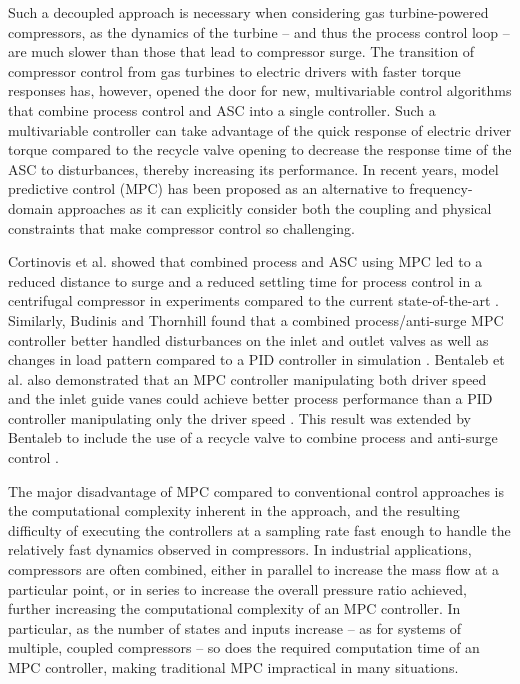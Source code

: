 Such a decoupled approach is necessary when considering gas turbine-powered compressors, as the dynamics of the turbine -- and thus the process control loop -- are much slower than those that lead to compressor surge. 
The transition of compressor control from gas turbines to electric drivers with faster torque responses has, however, opened the door for new, multivariable control algorithms that combine process control and ASC into a single controller.
Such a multivariable controller can take advantage of the quick response of electric driver torque compared to the recycle valve opening to decrease the response time of the ASC to disturbances, thereby increasing its performance.
In recent years, model predictive control (MPC) has been proposed as an alternative to frequency-domain approaches as it can explicitly consider both the coupling and physical constraints that make compressor control so challenging.

Cortinovis et al. showed that combined process and ASC using MPC led to a reduced distance to surge and a reduced settling time for process control in a centrifugal compressor in experiments compared to the current state-of-the-art \cite{Cortinovis2015}. 
Similarly, Budinis and Thornhill found that a combined process/anti-surge MPC controller better handled disturbances on the inlet and outlet valves as well as changes in load pattern compared to a PID controller in simulation \cite{Budinis2015}.
Bentaleb et al. also demonstrated that an MPC controller manipulating both driver speed and the inlet guide vanes could achieve better process performance than a PID controller manipulating only the driver speed \cite{Bentaleb2014}.
This result was extended by Bentaleb to include the use of a recycle valve to combine process and anti-surge control \cite{Bentaleb2015}.


The major disadvantage of MPC compared to conventional control approaches is the computational complexity inherent in the approach, and the resulting difficulty of executing the controllers at a sampling rate fast enough to handle the relatively fast dynamics observed in compressors. 
In industrial applications, compressors are often combined, either in parallel to increase the mass flow at a particular point, or in series to increase the overall pressure ratio achieved, further increasing the computational complexity of an MPC controller.
In particular, as the number of states and inputs increase -- as for systems of multiple, coupled compressors -- so does the required computation time of an MPC controller, making traditional MPC impractical in many situations. 

